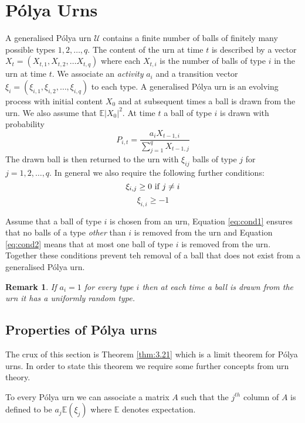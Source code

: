 \documentclass[8pt]{article} %
\newtheorem{remk}{Remark}
\theoremstyle{definition}
\begin{document}
\section{P\'{o}lya Urns}
A generalised P\'{o}lya urn $\mathcal{U}$ contains a finite number of balls of finitely many possible types $1,2,\dots,q$. The content of the urn at time $t$
is described by a vector $X_{t} = (X_{t,1},X_{t,2},\dots X_{t,q})$ where each $X_{t,i}$ is the number of balls of type $i$ in the urn at time $t$.  We associate an
\emph{activity} $a_{i}$ and a transition vector $\xi_{i} = (\xi_{i,1},\xi_{i,2},\dots,\xi_{i,q})$ to each type.  A generalised P\'{o}lya urn is an evolving process with initial
content $X_0$ and at subsequent times a ball is drawn from the urn. We also assume that $\mathbb{E} \lvert X_0 \rvert^2$.  At time $t$ a ball of type $i$ is drawn with probability
\[P_{i,t} = \frac{a_{i}X_{t-1,i}}{\sum_{j=1}^q X_{t-1,j}}\]  
The drawn ball is then  returned to the urn with $\xi_{ij}$ balls of type $j$ for $j = 1,2,\dots,q$.  In general we also require the following further conditions:
\begin{equation}\label{eq:cond1}
 \xi_{i,j} \geq 0 \text{   if   } j \neq i\\ 
\end{equation}
\begin{equation}\label{eq:cond2}
 \xi_{i,i} \geq -1 
\end{equation}

Assume that a ball of type $i$ is chosen from an urn, Equation \ref{eq:cond1} ensures that no balls of a type \emph{other} than $i$ is removed from the urn and Equation \ref{eq:cond2} means that at most one ball of type $i$  is removed from the urn.  Together these conditions prevent teh removal of a ball that does not exist from a generalised P\'{o}lya urn.      

\begin{remk}
 If $a_i = 1$ for every type $i$ then at each time a ball is drawn from the urn it has a uniformly random type.   
\end{remk}

\subsection{Properties of P\'{o}lya urns}
The crux of this section is Theorem \ref{thm:3.21} which is a limit theorem for P\'{o}lya urns.  In order to state this theorem we require some further concepts from urn theory.

To every P\'{o}lya urn we can associate a matrix $A$ such that the $j^{th}$ column of $A$ is defined to be $a_j \mathbb{E}(\xi_{j})$ where $\mathbb{E}$ denotes expectation.
\end{document}
